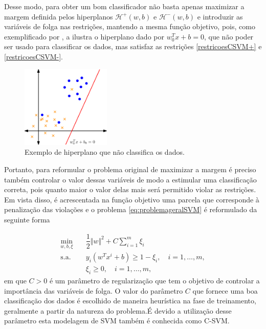 \documentclass[12pt,a4paper]{scrartcl}
\def\Hset{\mathcal{H}}
\theoremstyle{definition}%
\begin{document}
Desse modo, para obter um bom classificador não basta apenas maximizar a margem definida pelos hiperplanos $\Hset^{+} (w,b)$ e $\Hset^{-} (w,b)$ e introduzir as variáveis de folga nas restrições, mantendo a mesma função objetivo, pois, como exemplificado por \textcite{Evelin2017}, a  ilustra o hiperplano dado por $w_{0}^{T}x+b = 0$, que não poder ser usado para classificar os dados, mas satisfaz as restrições \eqref{restricoesCSVM+} e \eqref{restricoesCSVM-}. 

\begin{figure}[!ht] 
	\centering
	\includegraphics[width=0.38\textwidth]{hiperplano_nao_classifica_dados}
	\caption{Exemplo de hiperplano que não classifica os dados. \label{fig:hiperplano_nao_classificador}}
\end{figure}
 

Portanto, para reformular o problema original de maximizar a margem é preciso também controlar o valor dessas variáveis de modo a estimular uma classificação correta, pois quanto maior o valor delas mais será permitido violar as restrições. Em vista disso, é acrescentada na função objetivo uma parcela que corresponde à penalização das violações e o problema \eqref{eq:problemageralSVM} é reformulado da seguinte forma

\[ \label{eq:problemaCSVM}
\begin{aligned}
\min_{w,b,\xi} & \quad \dfrac{1}{2} \Vert w\Vert^{2} + C \sum_{i=1}^{m} \xi_{i} \\
\text{s.a.} &  \quad y_i(w^{T}x^{i}+b) \geq 1 - \xi_{i}, \quad i=1, \ldots , m, \\
& \quad \xi_{i} \geq 0, \quad i=1, \ldots , m,\end{aligned}
\]
em que $C>0$ é um parâmetro de regularização que tem o objetivo de controlar a importância das variáveis de folga. O valor do parâmetro $C$ que fornece uma boa classificação dos dados é escolhido de maneira heurística na fase de treinamento, geralmente a partir da natureza do problema.É devido a utilização desse parâmetro esta modelagem de SVM também é conhecida como C-SVM.
\end{document}
